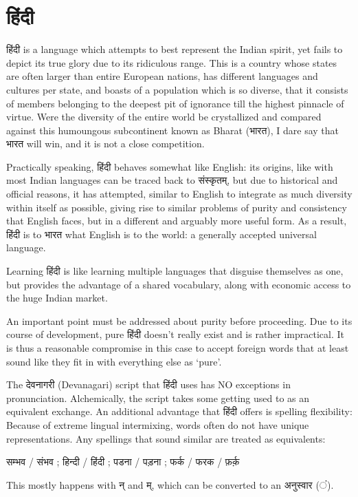 \chapter[Hindi]{\textsanskrit{हिंदी}} \label{chap:hi}
{\color{intro}}

\textsanskrit{हिंदी} is a language which attempts to best represent the Indian spirit, yet fails to depict its true glory due to its ridiculous range. This is a country whose states are often larger than entire European nations, has different languages and  cultures per state, and boasts of a population which is so diverse, that it consists of members belonging to the deepest pit of ignorance till the highest pinnacle of virtue. Were the diversity of the entire world be crystallized and compared against this humoungous subcontinent known as Bharat (\textsanskrit{भारत}), I dare say that \textsanskrit{भारत} will win, and it is not a close competition.

Practically speaking, \textsanskrit{हिंदी} behaves somewhat like English: its origins, like with most Indian languages can be traced back to \textsanskrit{संस्कृतम्}, but due to historical and official reasons, it has attempted, similar to English to integrate as much diversity within itself as possible, giving rise to similar problems of purity and consistency that English faces, but in a different and arguably more useful form. As a result, \textsanskrit{हिंदी} is to \textsanskrit{भारत} what English is to the world: a generally accepted universal language. 

Learning \textsanskrit{हिंदी} is like learning multiple languages that disguise themselves as one, but provides the advantage of a shared vocabulary, along with economic access to the  huge Indian market.

An important point must be addressed about purity before proceeding. Due to its course of development, pure \textsanskrit{हिंदी} doesn't really exist and is rather impractical. It is thus a reasonable compromise in this case  to accept foreign words that at least sound like they fit in with everything else as `pure'.

The \textsanskrit{देवनागरी} (Devanagari) script that \textsanskrit{हिंदी} uses  has NO exceptions in pronunciation. Alchemically, the script takes some getting used to as an equivalent exchange. An additional  advantage that \textsanskrit{हिंदी} offers is spelling flexibility: Because of extreme  lingual intermixing, words often do not have unique representations. Any spellings that sound similar are treated as equivalents:
\begin{example}
    \textsanskrit{सम्भव / संभव ; हिन्दी / हिंदी ; पडना / पड़ना ; फर्क / फरक / फ़र्क़}
\end{example}
This mostly happens with  \textsanskrit{न्} and  \textsanskrit{म्}, which can be converted to an \textsanskrit{अनुस्वार} (\textsanskrit{ं}).

